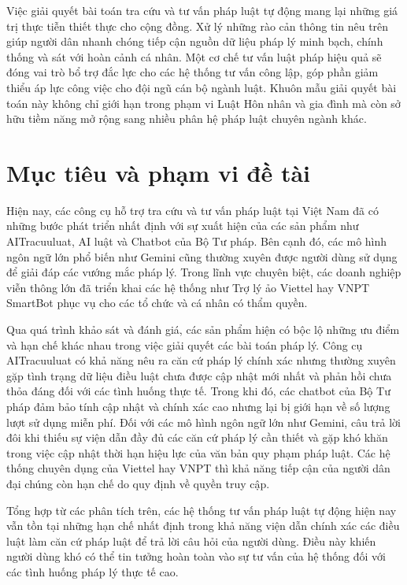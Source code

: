 \documentclass[../DoAn.tex]{subfiles}
\begin{document}
Việc giải quyết bài toán tra cứu và tư vấn pháp luật tự động mang lại những giá trị thực tiễn thiết thực cho cộng đồng. Xử lý những rào cản thông tin nêu trên giúp người dân nhanh chóng tiếp cận nguồn dữ liệu pháp lý minh bạch, chính thống và sát với hoàn cảnh cá nhân. Một cơ chế tư vấn luật pháp hiệu quả sẽ đóng vai trò bổ trợ đắc lực cho các hệ thống tư vấn công lập, góp phần giảm thiểu áp lực công việc cho đội ngũ cán bộ ngành luật. Khuôn mẫu giải quyết bài toán này không chỉ giới hạn trong phạm vi Luật Hôn nhân và gia đình mà còn sở hữu tiềm năng mở rộng sang nhiều phân hệ pháp luật chuyên ngành khác.
\section{Mục tiêu và phạm vi đề tài}
\label{section:1.2}

Hiện nay, các công cụ hỗ trợ tra cứu và tư vấn pháp luật tại Việt Nam đã có những bước phát triển nhất định với sự xuất hiện của các sản phẩm như AITracuuluat, AI luật và Chatbot của Bộ Tư pháp. Bên cạnh đó, các mô hình ngôn ngữ lớn phổ biến như Gemini cũng thường xuyên được người dùng sử dụng để giải đáp các vướng mắc pháp lý. Trong lĩnh vực chuyên biệt, các doanh nghiệp viễn thông lớn đã triển khai các hệ thống như Trợ lý ảo Viettel hay VNPT SmartBot phục vụ cho các tổ chức và cá nhân có thẩm quyền.

Qua quá trình khảo sát và đánh giá, các sản phẩm hiện có bộc lộ những ưu điểm và hạn chế khác nhau trong việc giải quyết các bài toán pháp lý. Công cụ AITracuuluat có khả năng nêu ra căn cứ pháp lý chính xác nhưng thường xuyên gặp tình trạng dữ liệu điều luật chưa được cập nhật mới nhất và phản hồi chưa thỏa đáng đối với các tình huống thực tế. Trong khi đó, các chatbot của Bộ Tư pháp đảm bảo tính cập nhật và chính xác cao nhưng lại bị giới hạn về số lượng lượt sử dụng miễn phí. Đối với các mô hình ngôn ngữ lớn như Gemini, câu trả lời đôi khi thiếu sự viện dẫn đầy đủ các căn cứ pháp lý cần thiết và gặp khó khăn trong việc cập nhật thời hạn hiệu lực của văn bản quy phạm pháp luật. Các hệ thống chuyên dụng của Viettel hay VNPT thì khả năng tiếp cận của người dân đại chúng còn hạn chế do quy định về quyền truy cập.

Tổng hợp từ các phân tích trên, các hệ thống tư vấn pháp luật tự động hiện nay vẫn tồn tại những hạn chế nhất định trong khả năng viện dẫn chính xác các điều luật làm căn cứ pháp luật để trả lời câu hỏi của người dùng. Điều này khiến người dùng khó có thể tin tưởng hoàn toàn vào sự tư vấn của hệ thống đối với các tình huống pháp lý thực tế cao.
\end{document}
